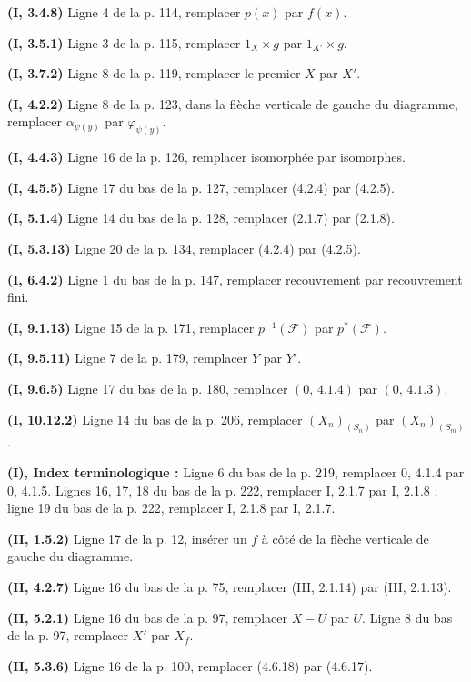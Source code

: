 \noindent\textbf{(I, 3.4.8)} Ligne 4 de la p. 114, remplacer $p(x)$ par
$f(x)$.

\noindent\textbf{(I, 3.5.1)} Ligne 3 de la p. 115, remplacer $1_X\times g$
par $1_{X'}\times g$.

\noindent\textbf{(I, 3.7.2)} Ligne 8 de la p. 119, remplacer le premier $X$
par $X'$.

\noindent\textbf{(I, 4.2.2)} Ligne 8 de la p. 123, dans la flèche verticale de
gauche du diagramme, remplacer $\alpha_{\psi(y)}$ par $\varphi_{\psi(y)}$.

\noindent\textbf{(I, 4.4.3)} Ligne 16 de la p. 126, remplacer isomorphée par
isomorphes.

\noindent\textbf{(I, 4.5.5)} Ligne 17 du bas de la p. 127, remplacer (4.2.4)
par (4.2.5).

\noindent\textbf{(I, 5.1.4)} Ligne 14 du bas de la p. 128, remplacer (2.1.7)
par (2.1.8).

\noindent\textbf{(I, 5.3.13)} Ligne 20 de la p. 134, remplacer (4.2.4) par
(4.2.5).

\noindent\textbf{(I, 6.4.2)} Ligne 1 du bas de la p. 147, remplacer
recouvrement par recouvrement fini.

\noindent\textbf{(I, 9.1.13)} Ligne 15 de la p. 171, remplacer
$p^{-1}(\mathscr F)$ par $p^*(\mathscr F)$.

\noindent\textbf{(I, 9.5.11)} Ligne 7 de la p. 179, remplacer $Y$ par $Y'$.

\noindent\textbf{(I, 9.6.5)} Ligne 17 du bas de la p. 180, remplacer
$(0,\,4.1.4)$ par $(0,\,4.1.3)$.

\noindent\textbf{(I, 10.12.2)} Ligne 14 du bas de la p. 206, remplacer
$(X_n)_{(S_n)}$ par $(X_n)_{(S_m)}$.

\clearpage
{}
\noindent\textbf{(I), Index terminologique :} Ligne 6 du bas de la p. 219,
remplacer 0, 4.1.4 par 0, 4.1.5. Lignes 16, 17, 18 du bas de la p. 222,
remplacer I, 2.1.7 par I, 2.1.8 ; ligne 19 du bas de la p. 222, remplacer I,
2.1.8 par I, 2.1.7.

\noindent\textbf{(II, 1.5.2)} Ligne 17 de la p. 12, insérer un $f$ à côté de
la flèche verticale de gauche du diagramme.

\noindent\textbf{(II, 4.2.7)} Ligne 16 du bas de la p. 75, remplacer (III,
2.1.14) par (III, 2.1.13).

\noindent\textbf{(II, 5.2.1)} Ligne 16 du bas de la p. 97, remplacer $X-U$ par
$U$. Ligne 8 du bas de la p. 97, remplacer $X'$ par $X_f$.

\noindent\textbf{(II, 5.3.6)} Ligne 16 de la p. 100, remplacer (4.6.18) par
(4.6.17).

